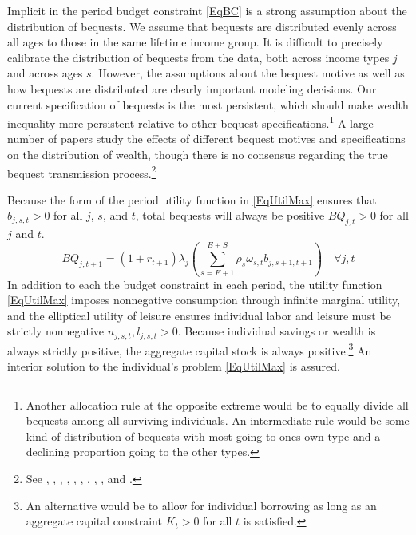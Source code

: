 \documentclass[letterpaper,12pt]{article}
\theoremstyle{definition}
\begin{document}
\begin{spacing}{1.5}
    Implicit in the period budget constraint \eqref{EqBC} is a strong assumption about the distribution of bequests. We assume that bequests are distributed evenly across all ages to those in the same lifetime income group. It is difficult to precisely calibrate the distribution of bequests from the data, both across income types $j$ and across ages $s$. However, the assumptions about the bequest motive as well as how bequests are distributed are clearly important modeling decisions. Our current specification of bequests is the most persistent, which should make wealth inequality more persistent relative to other bequest specifications.\footnote{Another allocation rule at the opposite extreme would be to equally divide all bequests among all surviving individuals. An intermediate rule would be some kind of distribution of bequests with most going to ones own type and a declining proportion going to the other types.} A large number of papers study the effects of different bequest motives and specifications on the distribution of wealth, though there is no consensus regarding the true bequest transmission process.\footnote{See \citet{DeNardiYang:2014}, \citet{DeNardi:2004}, \citet{Nishiyama:2002}, \citet{Laitner:2001}, \citet{GokhaleEtAl:2001}, \citet{GaleScholz:1994}, \citet{Hurd:1989}, \citet{VentiWise:1988}, \citet{KotlikoffSummers:1981}, and \citet{Wolff:2015}.}

    Because the form of the period utility function in \eqref{EqUtilMax} ensures that $b_{j,s,t}>0$ for all $j$, $s$, and $t$, total bequests will always be positive $BQ_{j,t}>0$ for all $j$ and $t$.
    \begin{equation}\label{EqTotBeq}
      BQ_{j,t+1} = (1+r_{t+1})\lambda_j\left(\sum_{s=E+1}^{E+S}\rho_s\omega_{s,t}b_{j,s+1,t+1}\right) \quad\forall j,t
    \end{equation}
    In addition to each the budget constraint in each period, the utility function \eqref{EqUtilMax} imposes nonnegative consumption through infinite marginal utility, and the elliptical utility of leisure ensures individual labor and leisure must be strictly nonnegative $n_{j,s,t},l_{j,s,t}> 0$. Because individual savings or wealth is always strictly positive, the aggregate capital stock is always positive.\footnote{An alternative would be to allow for individual borrowing as long as an aggregate capital constraint $K_{t}>0$ for all $t$ is satisfied.} An interior solution to the individual's problem \eqref{EqUtilMax} is assured.


\end{spacing}
\end{document}
